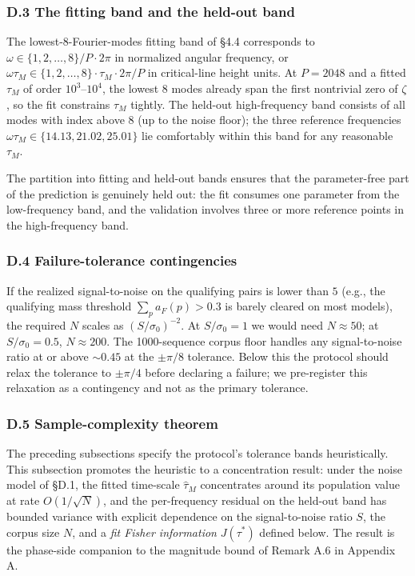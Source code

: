 \documentclass[
  letterpaper,
  11pt]{article}
\theoremstyle{plain}
\theoremstyle{definition}
\theoremstyle{remark}
\begin{document}
\subsubsection{D.3 The fitting band and the held-out band}\label{d.3-the-fitting-band-and-the-held-out-band}

The lowest-8-Fourier-modes fitting band of §4.4 corresponds to \(\omega \in \{1, 2, \ldots, 8\}/P \cdot 2\pi\) in normalized angular frequency, or \(\omega\tau_M \in \{1, 2, \ldots, 8\}\cdot \tau_M \cdot 2\pi/P\) in critical-line height units. At \(P = 2048\) and a fitted \(\tau_M\) of order \(10^3\)--\(10^4\), the lowest 8 modes already span the first nontrivial zero of \(\zeta\), so the fit constrains \(\tau_M\) tightly. The held-out high-frequency band consists of all modes with index above 8 (up to the noise floor); the three reference frequencies \(\omega\tau_M \in \{14.13, 21.02, 25.01\}\) lie comfortably within this band for any reasonable \(\tau_M\).

The partition into fitting and held-out bands ensures that the parameter-free part of the prediction is genuinely held out: the fit consumes one parameter from the low-frequency band, and the validation involves three or more reference points in the high-frequency band.

\subsubsection{D.4 Failure-tolerance contingencies}\label{d.4-failure-tolerance-contingencies}

If the realized signal-to-noise on the qualifying pairs is lower than \(5\) (e.g., the qualifying mass threshold \(\sum_p a_F(p) > 0.3\) is barely cleared on most models), the required \(N\) scales as \((S/\sigma_0)^{-2}\). At \(S/\sigma_0 = 1\) we would need \(N \approx 50\); at \(S/\sigma_0 = 0.5\), \(N \approx 200\). The 1000-sequence corpus floor handles any signal-to-noise ratio at or above \(\sim 0.45\) at the \(\pm\pi/8\) tolerance. Below this the protocol should relax the tolerance to \(\pm\pi/4\) before declaring a failure; we pre-register this relaxation as a contingency and not as the primary tolerance.

\subsubsection{D.5 Sample-complexity theorem}\label{d.5-sample-complexity-theorem}

The preceding subsections specify the protocol's tolerance bands heuristically. This subsection promotes the heuristic to a concentration result: under the noise model of §D.1, the fitted time-scale \(\hat\tau_M\) concentrates around its population value at rate \(O(1/\sqrt{N})\), and the per-frequency residual on the held-out band has bounded variance with explicit dependence on the signal-to-noise ratio \(S\), the corpus size \(N\), and a \emph{fit Fisher information} \(J(\tau^*)\) defined below. The result is the phase-side companion to the magnitude bound of Remark A.6 in Appendix A.
\end{document}
